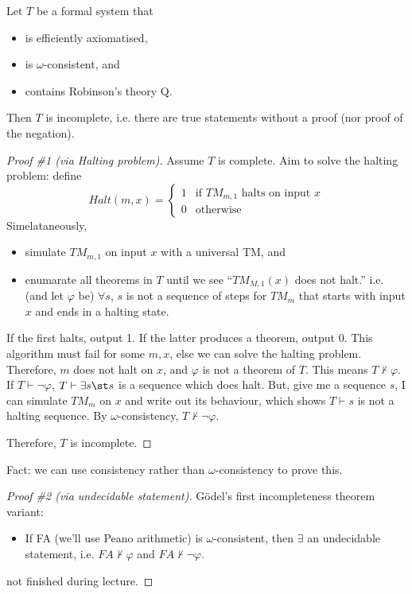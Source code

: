 \documentclass{article}
\begin{document}
\begin{theorem}
    Let \(T\) be a formal system that
    \begin{itemize}
        \item is efficiently axiomatised,
        \item is \(\omega\)-consistent, and
        \item contains Robinson's theory Q.
    \end{itemize}
    
    Then \(T\) is incomplete,
    i.e. there are true statements without a proof (nor proof of the negation).
    
    \begin{proof}[Proof \#1 (via Halting problem)]
        Assume \(T\) is complete.
        Aim to solve the halting problem: define
        \[Halt(m,x)=\begin{cases}
            1 & \text{if \(TM_{m,1}\) halts on input } x \\
            0 & \text{otherwise}
        \end{cases}\]
        Simelataneously,
        \begin{itemize}
            \item simulate \(TM_{m,1}\) on input \(x\) with a universal TM, and
            \item enumarate all theorems in \(T\)
            until we see ``\(TM_{M,1}(x)\) does not halt.''
            i.e. (and let \(\varphi\) be) \(\forall s\), \(s\) is not a sequence of steps for
            \(TM_{m}\) that starts with input \(x\) and ends in a halting state.
        \end{itemize}
        If the first halts, output 1.
        If the latter produces a theorem, output 0.
        This algorithm must fail for some \(m,x\), else we can solve the halting problem.
        Therefore, \(m\) does not halt on \(x\), and \(\varphi\) is not a theorem of \(T\).
        This means \(T \nvdash \varphi\).
        If \(T\vdash \lnot \varphi\), \(T\vdash \exists s \st s\) is a sequence which does halt.
        But, give me a sequence \(s\), I can simulate \(TM_{m}\) on \(x\)
        and write out its behaviour, which shows \(T \vdash s\) is not a halting sequence.
        By \(\omega\)-consistency, \(T\nvdash \lnot \varphi\).
        
        Therefore, \(T\) is incomplete.
    \end{proof}
    
    Fact: we can use consistency rather than \(\omega\)-consistency to prove this.
    
    \begin{proof}[Proof \#2 (via undecidable statement)]
        Gödel's first incompleteness theorem variant:
        \begin{itemize}
            \item If FA (we'll use Peano arithmetic) is \(\omega\)-consistent,
            then \(\exists\) an undecidable statement,
            i.e. \(FA \nvdash \varphi\) and \(FA \nvdash \lnot \varphi\).
        \end{itemize}
        not finished during lecture.
    \end{proof}
\end{theorem}
\end{document}
